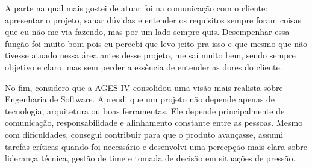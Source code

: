 A parte na qual mais gostei de atuar foi na comunicação com o cliente: apresentar o projeto, sanar dúvidas e entender os requisitos sempre foram coisas que eu não me via fazendo, mas por um lado sempre quis. Desempenhar essa função foi muito bom pois eu percebi que levo jeito pra isso e que mesmo que não tivesse atuado nessa área antes desse projeto, me saí muito bem, sendo sempre objetivo e claro, mas sem perder a essência de entender as dores do cliente.

No fim, considero que a AGES IV consolidou uma visão mais realista sobre Engenharia de Software. Aprendi que um projeto não depende apenas de tecnologia, arquitetura ou boas ferramentas. Ele depende principalmente de comunicação, responsabilidade e alinhamento constante entre as pessoas. Mesmo com dificuldades, consegui contribuir para que o produto avançasse, assumi tarefas críticas quando foi necessário e desenvolvi uma percepção mais clara sobre liderança técnica, gestão de time e tomada de decisão em situações de pressão.
